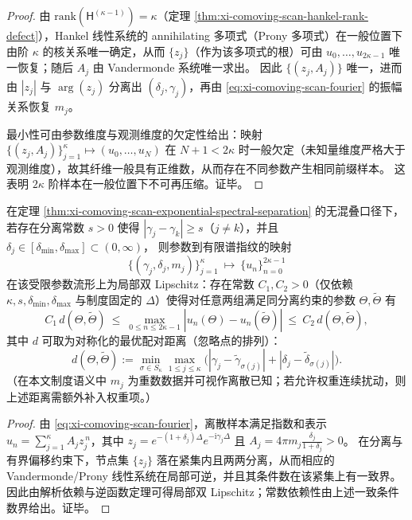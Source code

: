 \begin{proof}
由 \(\mathrm{rank}(\mathsf H^{(\kappa-1)})=\kappa\)（定理 \ref{thm:xi-comoving-scan-hankel-rank-defect}），Hankel 线性系统的 annihilating 多项式（Prony 多项式）在一般位置下由阶 \(\kappa\) 的核关系唯一确定，从而 \(\{z_j\}\)（作为该多项式的根）可由 \(u_0,\dots,u_{2\kappa-1}\) 唯一恢复；随后 \(A_j\) 由 Vandermonde 系统唯一求出。
因此 \(\{(z_j,A_j)\}\) 唯一，进而由 \(|z_j|\) 与 \(\arg(z_j)\) 分离出 \((\delta_j,\gamma_j)\)，再由 \eqref{eq:xi-comoving-scan-fourier} 的振幅关系恢复 \(m_j\)。
\par
最小性可由参数维度与观测维度的欠定性给出：映射
\(
\{(z_j,A_j)\}_{j=1}^{\kappa}\mapsto (u_0,\dots,u_N)
\)
在 \(N+1<2\kappa\) 时一般欠定（未知量维度严格大于观测维度），故其纤维一般具有正维数，从而存在不同参数产生相同前缀样本。
这表明 \(2\kappa\) 阶样本在一般位置下不可再压缩。证毕。
\end{proof}

\begin{theorem}[最小分离 \texorpdfstring{$\Rightarrow$}{=>} 反演稳定性：层析反演在几何间距约束下局部双 Lipschitz]\label{thm:xi-scan-min-separation-local-bilipschitz}
在定理 \ref{thm:xi-comoving-scan-exponential-spectral-separation} 的无混叠口径下，
若存在分离常数 \(s>0\) 使得 \(|\gamma_j-\gamma_k|\ge s\)（\(j\ne k\)），并且 \(\delta_j\in[\delta_{\min},\delta_{\max}]\subset(0,\infty)\)，
则参数到有限谱指纹的映射
\[
\{(\gamma_j,\delta_j,m_j)\}_{j=1}^{\kappa}\ \longmapsto\ \{u_n\}_{n=0}^{2\kappa-1}
\]
在该受限参数流形上为局部双 Lipschitz：存在常数 \(C_1,C_2>0\)（仅依赖 \(\kappa,s,\delta_{\min},\delta_{\max}\) 与制度固定的 \(\Delta\)）使得对任意两组满足同分离约束的参数 \(\Theta,\widetilde\Theta\) 有
\[
C_1\,d(\Theta,\widetilde\Theta)
\ \le\
\max_{0\le n\le 2\kappa-1}|u_n(\Theta)-u_n(\widetilde\Theta)|
\ \le\
C_2\,d(\Theta,\widetilde\Theta),
\]
其中 \(d\) 可取为对称化的最优配对距离（忽略点的排列）：
\[
d(\Theta,\widetilde\Theta)
:=
\min_{\sigma\in S_\kappa}\max_{1\le j\le \kappa}\bigl(|\gamma_j-\widetilde\gamma_{\sigma(j)}|+|\delta_j-\widetilde\delta_{\sigma(j)}|\bigr).
\]
（在本文制度语义中 \(m_j\) 为重数数据并可视作离散已知；若允许权重连续扰动，则上述距离需额外补入权重项。）
\end{theorem}

\begin{proof}
由 \eqref{eq:xi-comoving-scan-fourier}，离散样本满足指数和表示 \(u_n=\sum_{j=1}^{\kappa}A_j z_j^{\,n}\)，其中
\(
z_j=e^{-(1+\delta_j)\Delta}e^{-\mathrm{i}\gamma_j\Delta}
\)
且
\(
A_j=4\pi m_j\frac{\delta_j}{1+\delta_j}>0
\)。
在分离与有界偏移约束下，节点集 \(\{z_j\}\) 落在紧集内且两两分离，从而相应的 Vandermonde/Prony 线性系统在局部可逆，并且其条件数在该紧集上有一致界。
因此由解析依赖与逆函数定理可得局部双 Lipschitz；常数依赖性由上述一致条件数界给出。证毕。
\end{proof}


